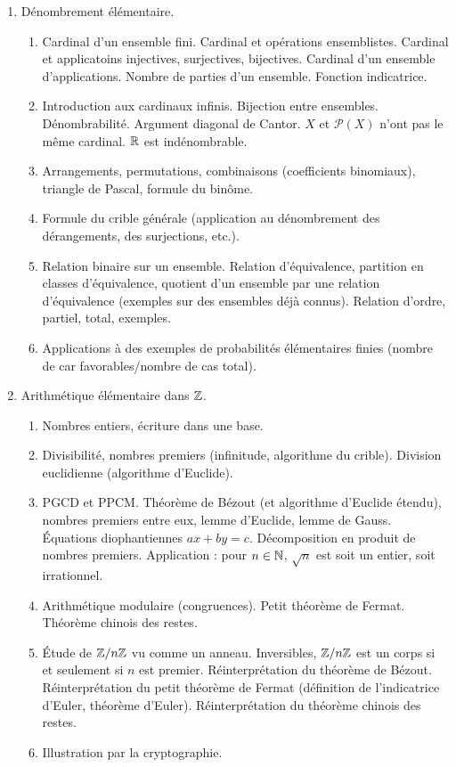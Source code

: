 \begin{enumerate}
	\item
	Dénombrement élémentaire.
	\begin{enumerate}
		\item
		Cardinal d'un ensemble fini.
		Cardinal et opérations ensemblistes.
		Cardinal et applicatoins injectives, surjectives, bijectives.
		Cardinal d'un ensemble d'applications.
		Nombre de parties d'un ensemble.
		Fonction indicatrice.
		\item
		Introduction aux cardinaux infinis.
		Bijection entre ensembles.
		Dénombrabilité.
		Argument diagonal de Cantor.
		$X$ et $\mathcal{P}(X)$ n'ont pas le même cardinal.
		$\mathbb{R}$ est indénombrable.
		\item
		Arrangements, permutations, combinaisons (coefficients binomiaux), triangle de Pascal, formule du binôme.
		\item
		Formule du crible générale (application au dénombrement des dérangements, des surjections, etc.).
		\item
		Relation binaire sur un ensemble.
		Relation d'équivalence, partition en classes d'équivalence, quotient d'un ensemble par une relation d'équivalence (exemples sur des ensembles déjà connus).
		Relation d'ordre, partiel, total, exemples.
		\item
		Applications à des exemples de probabilités élémentaires finies (nombre de car favorables/nombre de cas total).
	\end{enumerate}
	\item
	Arithmétique élémentaire dans $\mathbb{Z}$.
	\begin{enumerate}
		\item
		Nombres entiers, écriture dans une base.
		\item
		Divisibilité, nombres premiers (infinitude, algorithme du crible).
		Division euclidienne (algorithme d'Euclide).
		\item
		PGCD et PPCM.
		Théorème de Bézout (et algorithme d'Euclide étendu), nombres premiers entre eux, lemme d'Euclide, lemme de Gauss.
		Équations diophantiennes $ax+by=c$.
		Décomposition en produit de nombres premiers.
		Application : pour $n\in\mathbb{N}$, $\sqrt{n}$ est soit un entier, soit irrationnel.
		\item
		Arithmétique modulaire (congruences).
		Petit théorème de Fermat.
		Théorème chinois des restes.
		\item
		Étude de $\mathbb{Z}/n\mathbb{Z}$ vu comme un anneau.
		Inversibles, $\mathbb{Z}/n\mathbb{Z}$ est un corps si et seulement si $n$ est premier.
		Réinterprétation du théorème de Bézout.
		Réinterprétation du petit théorème de Fermat (définition de l'indicatrice d'Euler, théorème d'Euler).
		Réinterprétation du théorème chinois des restes.
		\item
		Illustration par la cryptographie.
	\end{enumerate}
\end{enumerate}

